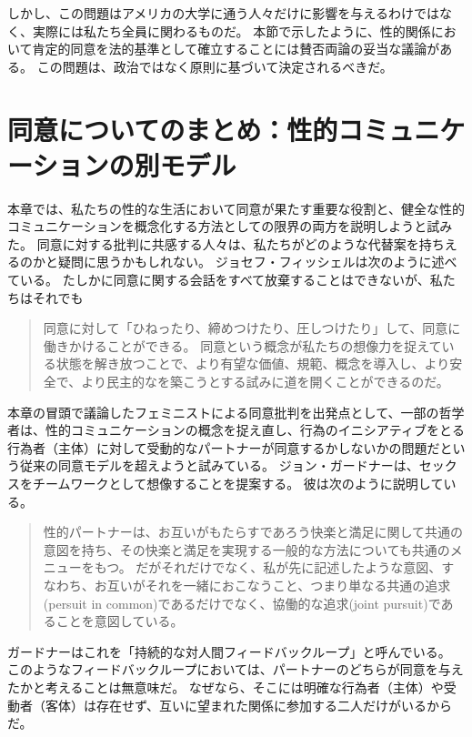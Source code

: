\documentclass[paper=a4,book,openany]{jlreq} \usepackage{mystyle}
\begin{document}
しかし、この問題はアメリカの大学に通う人々だけに影響を与えるわけではなく、実際には私たち全員に関わるものだ。
本節で示したように、性的関係において肯定的同意を法的基準として確立することには賛否両論の妥当な議論がある。
この問題は、政治ではなく原則に基づいて決定されるべきだ。

\section{同意についてのまとめ：性的コミュニケーションの別モデル}

本章では、私たちの性的な生活において同意が果たす重要な役割と、健全な性的コミュニケーションを概念化する方法としての限界の両方を説明しようと試みた。
同意に対する批判に共感する人々は、私たちがどのような代替案を持ちえるのかと疑問に思うかもしれない。
ジョセフ・フィッシェルは次のように述べている。
たしかに同意に関する会話をすべて放棄することはできないが、私たちはそれでも

\begin{quote}
同意に対して「ひねったり、締めつけたり、圧しつけたり」して、同意に働きかけることができる。
同意という概念が私たちの想像力を捉えている状態を解き放つことで、より有望な価値、規範、概念を導入し、より安全で、より民主的なを築こうとする試みに道を開くことができるのだ。
\citep[p.3]{fischel18:screwconsent}
\end{quote}

本章の冒頭で議論したフェミニストによる同意批判を出発点として、一部の哲学者は、性的コミュニケーションの概念を捉え直し、行為のイニシアティブをとる行為者（主体）に対して受動的なパートナーが同意するかしないかの問題だという従来の同意モデルを超えようと試みている。
ジョン・ガードナーは、セックスをチームワークとして想像することを提案する。
彼は次のように説明している。

\begin{quote}
性的パートナーは、お互いがもたらすであろう快楽と満足に関して共通の意図を持ち、その快楽と満足を実現する一般的な方法についても共通のメニューをもつ。
だがそれだけでなく、私が先に記述したような意図、すなわち、お互いがそれを一緒におこなうこと、つまり単なる共通の追求(persuit in common)であるだけでなく、協働的な追求(joint pursuit)であることを意図している。
\citep[p.54]{gardner18:_oppos_rape}
\end{quote}

ガードナーはこれを「持続的な対人間フィードバックループ」と呼んでいる\citep[p.55]{gardner18:_oppos_rape}。
このようなフィードバックループにおいては、パートナーのどちらが同意を与えたかと考えることは無意味だ。
なぜなら、そこには明確な行為者（主体）や受動者（客体）は存在せず、互いに望まれた関係に参加する二人だけがいるからだ。
\end{document}
